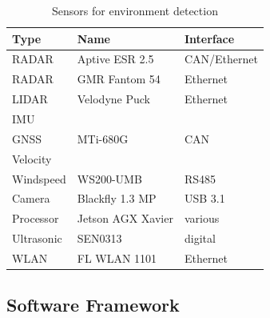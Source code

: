 \begin{table}[H]
	 \centering	
		\caption{Sensors for environment detection}
		\begin{tabular}{l l l } 
			\toprule
			Type  & Name  & Interface \\[0.25ex]
			\midrule
			RADAR&Aptive ESR 2.5 & CAN/Ethernet\\	
			RADAR & GMR Fantom 54 & Ethernet \\	
			LIDAR & Velodyne Puck & Ethernet \\	
			IMU &\multirow{3}{*}{MTi-680G}& \\  
			GNSS & &CAN\\
			Velocity&& \\
			Windspeed&WS200-UMB &  RS485\\ 
			Camera &Blackfly 1.3 MP& USB 3.1\\
			Processor & Jetson AGX Xavier  & various\\	
			Ultrasonic  & SEN0313  &  digital\\	
			WLAN & FL WLAN 1101& Ethernet \\
			\bottomrule
		\end{tabular}
	\label{tab_sensor}
\end{table}

\subsection{Software Framework} \label{Softframe}

